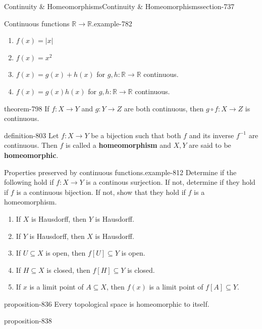\documentclass[oneside,10pt,]{article}
\newcommand{\terminology}[1]{\textbf{#1}}
\newcommand{\mb}{\mathbb}
\begin{document}
\begin{sectionptx}{Continuity \& Homeomorphisms}{}{Continuity \& Homeomorphisms}{}{}{section-737}
\begin{example}{Continuous functions \(\mb R\to\mb R\).}{example-782}
\begin{enumerate}
\item\hypertarget{li-788}{}\(f(x)=|x|\)%
\item\hypertarget{li-790}{}\(f(x)=x^2\)%
\item\hypertarget{li-792}{}\(f(x)=g(x)+h(x)\) for \(g,h:\mb R\to\mb R\) continuous.%
\item\hypertarget{li-795}{}\(f(x)=g(x)h(x)\) for \(g,h:\mb R\to\mb R\) continuous.%
\end{enumerate}
\end{example}
\begin{theorem}{}{}{theorem-798}%
\hypertarget{p-799}{}%
If \(f:X\to Y\) and \(g:Y\to Z\) are both continuous, then \(g\circ f:X\to Z\) is continuous.%
\end{theorem}
\begin{definition}{}{definition-803}%
\hypertarget{p-804}{}%
Let \(f:X\to Y\) be a bijection such that both \(f\) and its inverse \(f^{-1}\) are continuous. Then \(f\) is called a \terminology{homeomorphism} and \(X,Y\) are said to be \terminology{homeomorphic}.%
\end{definition}
\begin{example}{Properties preserved by continuous functions.}{example-812}%
\hypertarget{p-814}{}%
Determine if the following hold if \(f:X\to Y\) is a continous surjection. If not, determine if they hold if \(f\) is a continuous bijection. If not, show that they hold if \(f\) is a homeomorphism.%
\leavevmode%
\begin{enumerate}
\item\hypertarget{li-819}{}If \(X\) is Hausdorff, then \(Y\) is Hausdorff.%
\item\hypertarget{li-822}{}If \(Y\) is Hausdorff, then \(X\) is Hausdorff.%
\item\hypertarget{li-825}{}If \(U\subseteq X\) is open, then \(f[U]\subseteq Y\) is open.%
\item\hypertarget{li-828}{}If \(H\subseteq X\) is closed, then \(f[H]\subseteq Y\) is closed.%
\item\hypertarget{li-831}{}If \(x\) is a limit point of \(A\subseteq X\), then \(f(x)\) is a limit point of \(f[A]\subseteq Y\).%
\end{enumerate}
\end{example}
\begin{proposition}{}{}{proposition-836}%
\hypertarget{p-837}{}%
Every topological space is homeomorphic to itself.%
\end{proposition}
\begin{proposition}{}{}{proposition-838}%

\end{proposition}
\end{sectionptx}
\end{document}
